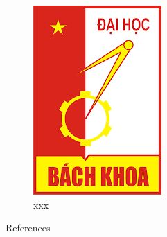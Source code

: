 \lipsum[1]

\begin{figure}[H]
\centering
\includegraphics[scale = 0.4]{pictures/HUST.png}
\caption{xxx}
\end{figure}


References \cite{syropoulos2007digital}